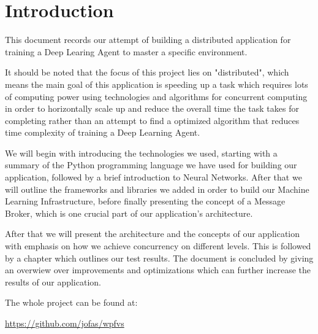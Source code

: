 \section{Introduction}

This document records our attempt of building a distributed
application for training a Deep Learing Agent to master a
specific environment.

It should be noted that the focus of this project lies on
"distributed", which means the main goal of this
application is speeding up a task which requires lots of
computing power using technologies and algorithms for
concurrent computing in order to horizontally scale up and
reduce the overall time the task takes for completing
rather than an attempt to find a optimized algorithm that
reduces time complexity of training a Deep Learning Agent.

We will begin with introducing the technologies we used,
starting with a summary of the Python programming language
we have used for building our application, followed by a
brief introduction to Neural Networks. After that we
will outline the frameworks and libraries we added in
order to build our Machine Learning Infrastructure, before
finally presenting the concept of a Message Broker, which
is one crucial part of our application's architecture.

After that we will present the architecture and the
concepts of our application with emphasis on how we
achieve concurrency on different levels. This is followed
by a chapter which outlines our test results. The document
is concluded by giving an overwiew over improvements and
optimizations which can further increase the results of our
application.

The whole project can be found at:
\begin{center}
  \url{https://github.com/jofas/wpfvs}
\end{center}
